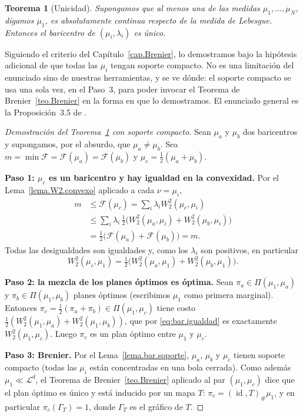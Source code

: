 \documentclass[12pt, a4paper]{amsbook}
\newcommand{\id}{\operatorname{id}}
\newtheorem{teo}{Teorema}[section]
\theoremstyle{remark}
\theoremstyle{definition}
\numberwithin{section}{chapter}
\numberwithin{subsection}{section}
\numberwithin{equation}{section}
\numberwithin{figure}{chapter}
\begin{document}
\begin{teo}[Unicidad]\label{teo.bar.unicidad}
Supongamos que al menos una de las medidas $\mu_1,\dots,\mu_N$, digamos
$\mu_1$, es absolutamente continua respecto de la medida de Lebesgue.
Entonces el baricentro de $(\mu_i,\lambda_i)$ es único.
\end{teo}

Siguiendo el criterio del Capítulo~\ref{cap.Brenier}, lo demostramos bajo la
hipótesis adicional de que todas las $\mu_i$ tengan soporte compacto. No es
una limitación del enunciado sino de nuestras herramientas, y se ve dónde:
el soporte compacto se usa una sola vez, en el Paso~3, para poder invocar el
Teorema de Brenier~\ref{teo.Brenier} en la forma en que lo demostramos. El
enunciado general es la Proposición~3.5 de \cite{AguehCarlier2011}.

\begin{proof}[Demostración del Teorema~\ref{teo.bar.unicidad} con soporte compacto]
Sean $\mu_a$ y $\mu_b$ dos baricentros y supongamos, por el absurdo, que
$\mu_a\neq\mu_b$. Sea $m=\min\mathcal F=\mathcal F(\mu_a)=\mathcal F(\mu_b)$ y
$\mu_c=\tfrac12(\mu_a+\mu_b)$.

\medskip
\textbf{Paso 1: $\mu_c$ es un baricentro y hay igualdad en la convexidad.}
Por el Lema~\ref{lema.W2.convexo} aplicado a cada $\nu=\mu_i$,
\[
\begin{aligned}
m&\le\mathcal F(\mu_c)
=\sum_i\lambda_iW_2^2(\mu_c,\mu_i)\\
&\le\sum_i\lambda_i\,\tfrac12\bigl(W_2^2(\mu_a,\mu_i)+W_2^2(\mu_b,\mu_i)\bigr)\\
&=\tfrac12\bigl(\mathcal F(\mu_a)+\mathcal F(\mu_b)\bigr)=m.
\end{aligned}
\]
Todas las desigualdades son igualdades y, como los $\lambda_i$ son positivos,
en particular
\begin{equation}\label{eq:bar.igualdad}
W_2^2(\mu_c,\mu_1)=\tfrac12\bigl(W_2^2(\mu_a,\mu_1)+W_2^2(\mu_b,\mu_1)\bigr).
\end{equation}

\medskip
\textbf{Paso 2: la mezcla de los planes óptimos es óptima.}
Sean $\pi_a\in\Pi(\mu_1,\mu_a)$ y $\pi_b\in\Pi(\mu_1,\mu_b)$ planes óptimos
(escribimos $\mu_1$ como primera marginal). Entonces
$\pi_c=\tfrac12(\pi_a+\pi_b)\in\Pi(\mu_1,\mu_c)$ tiene costo
$\tfrac12(W_2^2(\mu_1,\mu_a)+W_2^2(\mu_1,\mu_b))$, que por
\eqref{eq:bar.igualdad} es exactamente $W_2^2(\mu_1,\mu_c)$. Luego $\pi_c$ es
un plan óptimo entre $\mu_1$ y $\mu_c$.

\medskip
\textbf{Paso 3: Brenier.}
Por el Lema~\ref{lema.bar.soporte}, $\mu_a$, $\mu_b$ y $\mu_c$ tienen soporte
compacto (todas las $\mu_i$ están concentradas en una bola cerrada). Como
además $\mu_1\ll\mathcal L^d$, el Teorema de Brenier~\ref{teo.Brenier}
aplicado al par $(\mu_1,\mu_c)$ dice que el plan óptimo es único y está
inducido por un mapa $T$: $\pi_c=(\id,T)_\#\mu_1$, y en particular
$\pi_c(\Gamma_T)=1$, donde $\Gamma_T$ es el gráfico de $T$.


\end{proof}
\end{document}
